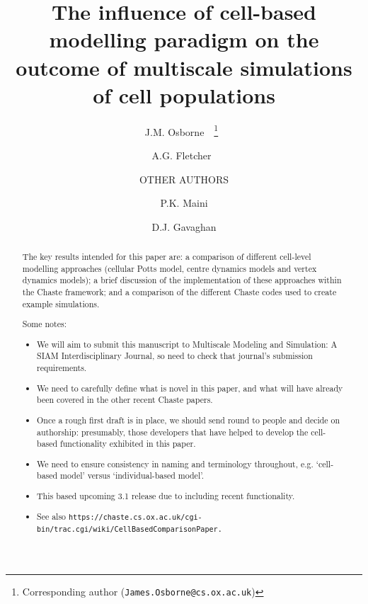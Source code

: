 \documentclass{siamltex}
\newcommand{\highlight}[1]{{\color{red} \bf{#1}}}
\begin{document}

\title{The influence of cell-based modelling paradigm on the outcome of multiscale simulations of cell populations}

\author{J.M. Osborne\footnotemark[2]\ \footnotemark[4]\ \thanks{Corresponding author ({\tt James.Osborne@cs.ox.ac.uk})}\ \and A.G. Fletcher\footnotemark[3]\ \footnotemark[4] \and OTHER AUTHORS\and P.K. Maini\footnotemark[3] \and D.J. Gavaghan\footnotemark[2]}

\renewcommand{\thefootnote}{\fnsymbol{footnote}}
\renewcommand{\thefootnote}{\arabic{footnote}}



\maketitle

\begin{abstract}
The key results intended for this paper are: a comparison of different cell-level modelling approaches (cellular Potts model, centre dynamics models and vertex dynamics models); a brief discussion of the implementation of these approaches within the Chaste framework; and a comparison of the different Chaste codes used to create example simulations. 

\highlight{Some notes:
\begin{itemize}
\item We will aim to submit this manuscript to Multiscale Modeling and Simulation: A SIAM Interdisciplinary Journal, so need to check that journal's submission requirements.
\item We need to carefully define what is novel in this paper, and what will have already been covered in the other recent Chaste papers.
\item Once a rough first draft is in place, we should send round to people and decide on authorship: presumably, those developers that have helped to develop the cell-based functionality exhibited in this paper.
\item We need to ensure consistency in naming and terminology throughout, e.g. `cell-based model' versus `individual-based model'.
\item This based upcoming 3.1 release due to including recent functionality.
\item See also \tt{https://chaste.cs.ox.ac.uk/cgi-bin/trac.cgi/wiki/CellBasedComparisonPaper}.
\end{itemize}
}
\end{abstract}
\end{document}
